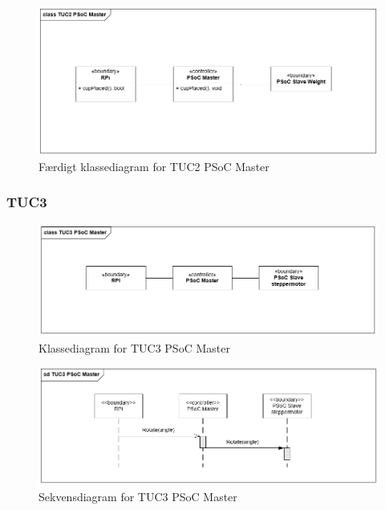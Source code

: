 \begin{figure}[H]
	\centering
	\includegraphics[width=1\textwidth]{Images/Applikationsmodeller/PSoCMaster/TUC2_cd_PSoC_Master_final.png}
	\caption{Færdigt klassediagram for TUC2 PSoC Master}
	\label{fig:cdTUC2PSoCMaster_final}
\end{figure}

\subsubsection{TUC3}
\begin{figure}[H]
	\centering
	\includegraphics[width=1\textwidth]{Images/Applikationsmodeller/PSoCMaster/TUC3_cd_PSoC_Master.png}
	\caption{Klassediagram for TUC3 PSoC Master}
	\label{fig:cdTUC3PSoCMaster}
\end{figure}

\begin{figure}[H]
	\centering
	\includegraphics[width=1\textwidth]{Images/Applikationsmodeller/PSoCMaster/TUC3_sd_PSoC_Master.png}
	\caption{Sekvensdiagram for TUC3 PSoC Master}
	\label{fig:sdTUC3PSoCMaster}
\end{figure}

